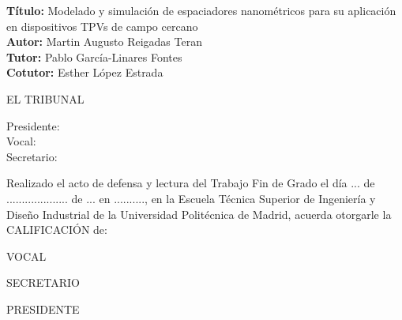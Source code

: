 \cleardoublepage

\begin{flushleft} \large
\textbf{Título:} Modelado y simulación de espaciadores nanométricos para su aplicación en dispositivos TPVs de campo cercano \\
\textbf{Autor:} Martin Augusto Reigadas Teran\\
\textbf{Tutor:} Pablo García-Linares Fontes \\ 
\textbf{Cotutor:} Esther López Estrada\\ [1 cm]

\end{flushleft} 

\begin{center} \LARGE
EL TRIBUNAL \\ [1 cm]
\end{center}

\begin{flushleft} \LARGE
Presidente: \\ [1 cm]
Vocal: \\ [1 cm]
Secretario: \\ [1.5 cm]
\end{flushleft}

\large
Realizado el acto de defensa y lectura del Trabajo Fin de Grado el día ... de ....................   de ... en .........., en la Escuela Técnica Superior de Ingeniería y Diseño Industrial de la Universidad Politécnica de Madrid, acuerda otorgarle la CALIFICACIÓN de: \\ [2 cm]

\begin{center}
 \large VOCAL \\ [2.2 cm]
\end{center}

\begin{minipage}{0.5\textwidth}
 \begin{flushleft}
 \large SECRETARIO
\end{flushleft}
\end{minipage}
\begin{minipage}{0.5\textwidth}
\begin{flushright}
 \large PRESIDENTE
\end{flushright} 
\end{minipage}